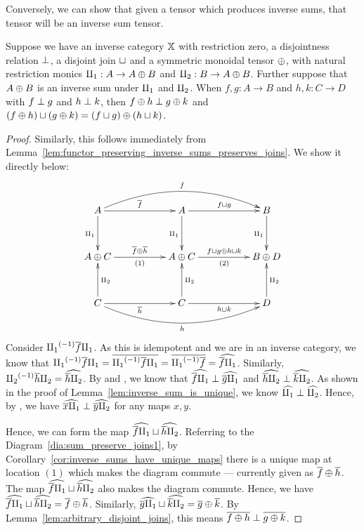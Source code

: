 Conversely, we can show that given a tensor which produces inverse sums, that tensor will
be an inverse sum tensor.

\begin{lemma}\label{lem:inverse_sums_give_inverse_sum_tensors}
  Suppose we have an inverse category $\mathbb{X}$ with restriction zero, a disjointness relation $\perp$, a
  disjoint join $\sqcup$ and a symmetric monoidal tensor $\oplus$, with natural restriction monics
  $\amalg_{1}: A\to A\oplus B$ and $\amalg_{2}: B \to A\oplus B$. Further suppose that $A\oplus B$ is an inverse sum under $\amalg_{1}$ and
  $\amalg_{2}$. When $f,g :A \to B$ and $h,k:C\to D$ with $f \perp g$ and $h \perp k$, then $f
  \oplus h \perp g\oplus k$ and $(f\oplus h)\sqcup (g\oplus k) = (f\sqcup g)\oplus (h\sqcup k)$.
\end{lemma}
\begin{proof}
  Similarly, this follows immediately from
  Lemma~\ref{lem:functor_preserving_inverse_sums_preserves_joins}. We show it directly below:
  \begin{equation}
    \xymatrix@R+10pt@C+28pt {
      A \ar[r]^{\rst{f}} \ar[d]_{\cpa} \ar@/^20pt/[rr]^f
        & A \ar[d]_{\cpa} \ar[r]^{f\djoin g} & B \ar[d]_{\cpa}\\
      A\+C \ar[r]^{\rst{f}\+\rst{h}}_{(1)}
        & A\+C  \ar[r]^{f\djoin g \+ h\djoin k}_{(2)} & B \+D \\
      C \ar[r]_{\rst{h}} \ar[u]_{\cpb} \ar@/_20pt/[rr]_h
        & C \ar[u]_{\cpb} \ar[r]_{h\djoin k} & D \ar[u]_{\cpb}
    }\label{dia:sum_preserve_joins1}
  \end{equation}
  Consider ${\amalg_{1}}^{(-1)} \overline{f}\amalg_{1}$. As this is idempotent and we are in an inverse category, we
  know that ${\amalg_{1}}^{(-1)} \overline{f}\amalg_{1} = \overline{{\amalg_{1}}^{(-1)} \overline{f}\amalg_{1}} = \overline{{\amalg_{1}}^{(-1)}\overline{f}} =
  \widehat{\overline{f}\amalg_{1}}$. Similarly, ${\amalg_{2}}^{(-1)}\overline{h}\amalg_{2} = \widehat{\overline{h}\amalg_{2}}$. By  and
  , we know that $\widehat{\overline{f}\amalg_{1}} \perp \widehat{\overline{g}\amalg_{1}}$ and $\widehat{\overline{h}\amalg_{2}}
  \perp \widehat{\overline{k}\amalg_{2}}$. As shown in the proof of
  Lemma~\ref{lem:inverse_sum_is_unique}, we know $\widehat{\amalg_{1}}\perp \widehat{\amalg_{2}}$. Hence, by
  , we have $\widehat{\overline{x}\amalg_{1}} \perp \widehat{\overline{y}\amalg_{2}}$ for any maps $x,y$.

  Hence, we can form the map $\widehat{\overline{f}\amalg_{1}} \sqcup \widehat{\overline{h}\amalg_{2}}$. Referring to the
  Diagram~\ref{dia:sum_preserve_joins1}, by Corollary~\ref{cor:inverse_sums_have_unique_maps} there is
  a unique map at location $(1)$ which makes the diagram commute --- currently given as
  $\overline{f}\oplus\overline{h}$. The map $\widehat{\overline{f}\amalg_{1}} \sqcup \widehat{\overline{h}\amalg_{2}}$ also makes the diagram commute.
  Hence, we have $\widehat{\overline{f}\amalg_{1}} \sqcup \widehat{\overline{h}\amalg_{2}} = \overline{f}\oplus\overline{h}$. Similarly,
  $\widehat{\overline{g}\amalg_{1}} \sqcup \widehat{\overline{k}\amalg_{2}} = \overline{g}\oplus\overline{k}$. By
  Lemma~\ref{lem:arbitrary_disjoint_joins}, this means $\overline{f\oplus h} \perp \overline{g\oplus k}$.


\end{proof}
